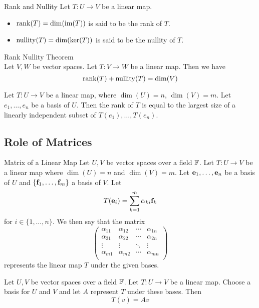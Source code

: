 \documentclass[a4paper]{article}
\begin{document}
\begin{defn}{Rank and Nullity}{} Let $T:U\to V$ be a linear map. 
\begin{itemize}
\item $\rank(T)=\dim(\operatorname{im}(T))$ is said to be the rank of $T$. 
\item $\operatorname{nullity}(T)=\dim(\ker(T))$ is said to be the nullity of $T$. 
\end{itemize}
\end{defn}

\begin{thm}{Rank Nullity Theorem}{}\\
Let $V,W$ be vector spaces. Let $T:V\to W$ be a linear map. Then we have $$\rank(T)+\operatorname{nullity}(T)=\dim(V)$$
\end{thm}

\begin{thm}{}{} Let $T:U\to V$ be a linear map, where $\dim(U)=n$, $\dim(V)=m$. Let $e_1,\dots,e_n$ be a basis of $U$. Then the rank of $T$ is equal to the largest size of a linearly independent subset of $T(e_1),\dots,T(e_n)$. 
\end{thm}

\subsection{Role of Matrices}
\begin{defn}{Matrix of a Linear Map}{} Let $U,V$ be vector spaces over a field $\mathbb{F}$. Let $T:U\to V$ be a linear map where $\dim(U)=n$ and $\dim(V)=m$. Let $\vb{e}_1,\dots,\vb{e}_n$ be a basis of $U$ and $\{\vb{f}_1,\dots,\vb{f}_m\}$ a basis of $V$. Let $$T(\vb{e}_i)=\sum_{k=1}^m\alpha_{ki}\vb{f}_k$$ for $i\in\{1,\dots,n\}$. We then say that the matrix $$\begin{pmatrix}
\alpha_{11} & \alpha_{12} & \cdots & \alpha_{1n}\\
\alpha_{21} & \alpha_{22} & \cdots & \alpha_{2n}\\
\vdots & \vdots & \ddots & \vdots\\
\alpha_{m1} & \alpha_{m2} & \cdots & \alpha_{mn}\\
\end{pmatrix}$$ represents the linear map $T$ under the given bases. 
\end{defn}

\begin{thm}{}{} Let $U,V$ be vector spaces over a field $\mathbb{F}$. Let $T:U\to V$ be a linear map. Choose a basis for $U$ and $V$ and let $A$ represent $T$ under these bases. Then $$T(v)=Av$$
\end{thm}
\end{document}
